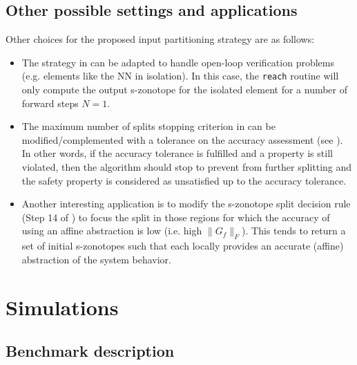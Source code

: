 \documentclass[journal]{IEEEtran}
\begin{document}
\subsection{Other possible settings and applications} \label{sec:discussion_agl}

Other choices for the proposed input partitioning strategy are as follows:
 \begin{itemize}  
    \item The strategy in  can  be adapted to handle open-loop verification problems (e.g. elements like the NN in isolation). In this case, the \texttt{reach} routine will only compute the output s-zonotope for the isolated element for a number of forward steps $N=1$.
    \item The maximum number of splits stopping criterion in  can be modified/complemented with a tolerance on the accuracy assessment  (see ). In other words, if the accuracy tolerance is fulfilled and a property is still violated, then the algorithm should stop to prevent from further splitting and the safety property is considered as unsatisfied up to the accuracy tolerance.
    \item  Another interesting application is to modify 
    the s-zonotope  split decision rule (Step 14 of ) to focus the split  in those regions for which the accuracy of using an affine abstraction is low (i.e. high $\|G_f\|_F$). This tends to return a set of initial s-zonotopes such that each %
    locally provides an accurate (affine) abstraction of the system behavior.   
\end{itemize}



\section{Simulations} \label{sec:simulations}


\subsection{Benchmark description}
\end{document}
